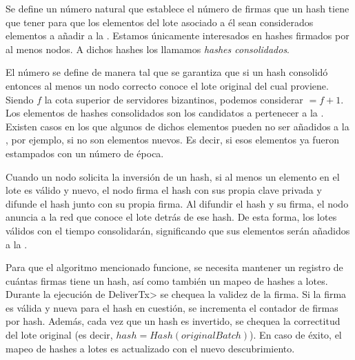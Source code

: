 %
Se define un número natural \SPH que establece
el número de firmas que un hash tiene que tener para que los elementos del lote asociado a él
sean considerados elementos a añadir a la \setchain.
%
Estamos únicamente interesados en hashes firmados por al menos \SPH
nodos. A dichos hashes los llamamos \textit{hashes consolidados}.

El número \SPH se define de manera tal que se garantiza que si un hash
consolidó entonces al menos un nodo correcto conoce el lote original del cual proviene.
%
Siendo $f$ la cota superior de servidores bizantinos, podemos considerar \SPH $= f + 1$.
Los elementos de hashes consolidados son los candidatos a pertenecer a la \setchain.
%
Existen casos en los que algunos de dichos elementos pueden no ser añadidos a la \setchain,
por ejemplo, si no son elementos nuevos.
Es decir, si esos elementos ya fueron estampados con un número de época.

%
Cuando un nodo solicita la inversión de un hash, si al menos un elemento en el lote
es válido y nuevo, el nodo firma el hash con sus propia clave privada y difunde el hash junto
con su propia firma.
%
Al difundir el hash y su firma, el nodo anuncia a la red que conoce el lote detrás de ese hash.
%
De esta forma, los lotes válidos con el tiempo consolidarán, significando que sus elementos
serán añadidos a la \setchain.

Para que el algoritmo mencionado funcione, se necesita mantener un registro de cuántas firmas tiene un hash,
así como también un mapeo de hashes a lotes.
%
Durante la ejecución de \<DeliverTx> se chequea la validez de la firma.
%
Si la firma es válida y nueva para el hash en cuestión, se incrementa el contador de
firmas por hash.
%
Además, cada vez que un hash es invertido, se chequea la correctitud del lote original
(es decir, $hash = Hash(originalBatch)$). En caso de éxito, el mapeo de hashes a lotes
es actualizado con el nuevo descubrimiento.

%


